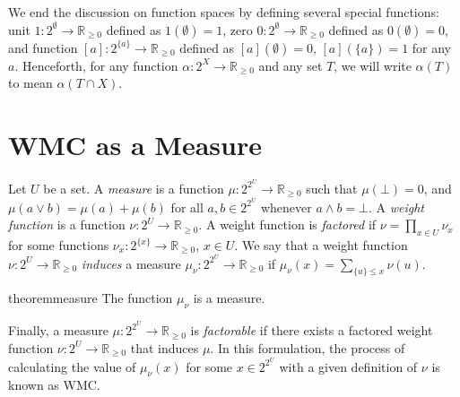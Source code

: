 \documentclass[letterpaper]{article} %
\theoremstyle{definition}
\theoremstyle{remark}
\begin{document}
{We end the discussion on function spaces by defining several special functions:
unit $1\colon 2^\emptyset \to \mathbb{R}_{\ge 0}$ defined as $1(\emptyset) = 1$,
zero $0\colon 2^\emptyset \to \mathbb{R}_{\ge 0}$ defined as $0(\emptyset) = 0$,
and function $[a]\colon 2^{\{a\}} \to \mathbb{R}_{\ge 0}$ defined as
$[a](\emptyset) = 0$, $[a](\{a\}) = 1$ for any $a$. Henceforth, for any function
$\alpha\colon 2^X \to \mathbb{R}_{\ge 0}$ and any set $T$, we will write
$\alpha(T)$ to mean $\alpha(T \cap X)$.

\section{WMC as a Measure}

Let $U$ be a set. A \emph{measure} is a function $\mu\colon 2^{2^U} \to
\mathbb{R}_{\ge 0}$ such that $\mu(\bot) = 0$, and $\mu(a \lor b) = \mu(a) +
\mu(b)$ for all $a, b \in 2^{2^U}$ whenever $a \land b = \bot$. A \emph{weight
  function} is a function $\nu\colon 2^U \to \mathbb{R}_{\ge 0}$. A weight
function is \emph{factored} if $\nu = \prod_{x \in U} \nu_x$ for some functions
$\nu_x\colon 2^{\{x\}} \to \mathbb{R}_{\ge 0}$, $x \in U$. We say that a weight
function $\nu\colon 2^U \to \mathbb{R}_{\ge 0}$ \emph{induces} a measure
$\mu_\nu\colon 2^{2^U} \to \mathbb{R}_{\ge 0}$ if $\mu_\nu(x) = \sum_{\{u\} \le
  x} \nu(u)$.

\begin{restatable}{theorem}{measure} \label{prop:measure}
  The function $\mu_\nu$ is a measure.
\end{restatable}

Finally, a measure $\mu\colon 2^{2^U} \to \mathbb{R}_{\ge 0}$ is
\emph{factorable} if there exists a factored weight function $\nu\colon 2^U \to
\mathbb{R}_{\ge 0}$ that induces $\mu$. In this formulation, the process of
calculating the value of $\mu_\nu(x)$ for some $x \in 2^{2^U}$ with a given
definition of $\nu$ is known as WMC.

}
\end{document}
